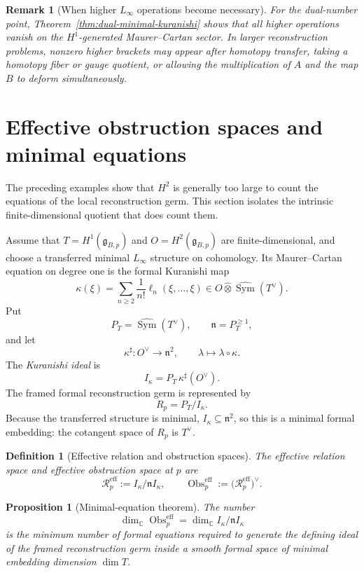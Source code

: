 \documentclass[11pt]{amsart}
\newtheorem{proposition}[theorem]{Proposition}
\newtheorem{definition}[theorem]{Definition}
\newtheorem{remark}[theorem]{Remark}
\newcommand{\Obs}{\operatorname{Obs}}
\newcommand{\C}{\mathbb C}
\newcommand{\ghoch}{\mathfrak g}
\begin{document}
\begin{remark}[When higher $L_\infty$ operations become necessary]
For the dual-number point, Theorem~\ref{thm:dual-minimal-kuranishi} shows that all higher operations vanish on the $H^1$-generated Maurer--Cartan sector.  In larger reconstruction problems, nonzero higher brackets may appear after homotopy transfer, taking a homotopy fiber or gauge quotient, or allowing the multiplication of $A$ and the map $B$ to deform simultaneously.
\end{remark}


\section{Effective obstruction spaces and minimal equations}\label{sec:effective-obstruction}

The preceding examples show that $H^2$ is generally too large to count the equations of the local reconstruction germ.  This section isolates the intrinsic finite-dimensional quotient that does count them.

Assume that $T=H^1(\ghoch_{B,p})$ and $O=H^2(\ghoch_{B,p})$ are finite-dimensional, and choose a transferred minimal $L_\infty$ structure on cohomology.  Its Maurer--Cartan equation on degree one is the formal Kuranishi map
\[
\kappa(\xi)
=
\sum_{n\ge2}\frac1{n!}\ell_n(\xi,\ldots,\xi)
\in O\widehat\otimes \widehat{\operatorname{Sym}}(T^\vee).
\]
Put
\[
P_T=\widehat{\operatorname{Sym}}(T^\vee),
\qquad
\mathfrak n=P_T^{\ge1},
\]
and let
\[
\kappa^\sharp:O^\vee\longrightarrow\mathfrak n^2,
\qquad
\lambda\longmapsto \lambda\circ\kappa.
\]
The \emph{Kuranishi ideal} is
\[
I_\kappa=P_T\,\kappa^\sharp(O^\vee).
\]
The framed formal reconstruction germ is represented by
\[
R_p=P_T/I_\kappa.
\]
Because the transferred structure is minimal, $I_\kappa\subseteq\mathfrak n^2$, so this is a minimal formal embedding: the cotangent space of $R_p$ is $T^\vee$.

\begin{definition}[Effective relation and obstruction spaces]\label{def:effective-obstruction}
The effective relation space and effective obstruction space at $p$ are
\[
\mathscr R^{\mathrm{eff}}_p
:=
I_\kappa/\mathfrak n I_\kappa,
\qquad
\Obs^{\mathrm{eff}}_p
:=
\bigl(\mathscr R^{\mathrm{eff}}_p\bigr)^\vee.
\]
\end{definition}

\begin{proposition}[Minimal-equation theorem]\label{prop:minimal-equations}
The number
\[
\dim_\C\Obs^{\mathrm{eff}}_p
=
\dim_\C I_\kappa/\mathfrak n I_\kappa
\]
is the minimum number of formal equations required to generate the defining ideal of the framed reconstruction germ inside a smooth formal space of minimal embedding dimension $\dim T$.
\end{proposition}
\end{document}
